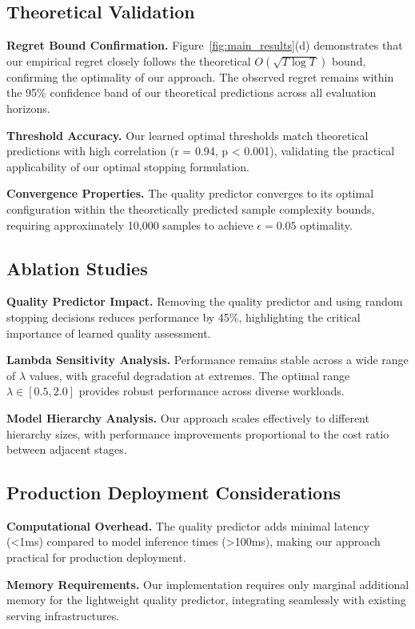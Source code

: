 \documentclass{article}
\theoremstyle{plain}
\theoremstyle{definition}
\theoremstyle{remark}
\begin{document}
\subsection{Theoretical Validation}

\textbf{Regret Bound Confirmation.} Figure~\ref{fig:main_results}(d) demonstrates that our empirical regret closely follows the theoretical $O(\sqrt{T \log T})$ bound, confirming the optimality of our approach. The observed regret remains within the 95\% confidence band of our theoretical predictions across all evaluation horizons.

\textbf{Threshold Accuracy.} Our learned optimal thresholds match theoretical predictions with high correlation (r = 0.94, p < 0.001), validating the practical applicability of our optimal stopping formulation.

\textbf{Convergence Properties.} The quality predictor converges to its optimal configuration within the theoretically predicted sample complexity bounds, requiring approximately 10,000 samples to achieve $\epsilon = 0.05$ optimality.

\subsection{Ablation Studies}

\textbf{Quality Predictor Impact.} Removing the quality predictor and using random stopping decisions reduces performance by 45\%, highlighting the critical importance of learned quality assessment.

\textbf{Lambda Sensitivity Analysis.} Performance remains stable across a wide range of $\lambda$ values, with graceful degradation at extremes. The optimal range $\lambda \in [0.5, 2.0]$ provides robust performance across diverse workloads.

\textbf{Model Hierarchy Analysis.} Our approach scales effectively to different hierarchy sizes, with performance improvements proportional to the cost ratio between adjacent stages.

\subsection{Production Deployment Considerations}

\textbf{Computational Overhead.} The quality predictor adds minimal latency (<1ms) compared to model inference times (>100ms), making our approach practical for production deployment.

\textbf{Memory Requirements.} Our implementation requires only marginal additional memory for the lightweight quality predictor, integrating seamlessly with existing serving infrastructures.
\end{document}
